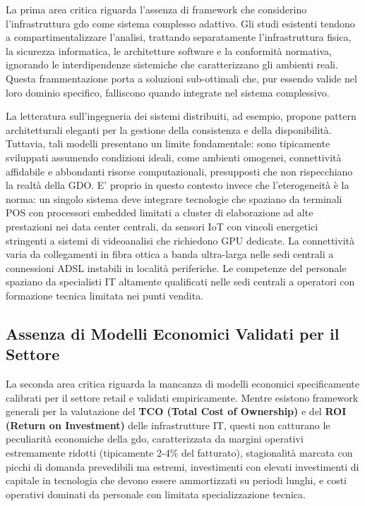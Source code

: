 La prima area critica riguarda l'assenza di framework che considerino l'infrastruttura \gls{gdo} come sistema complesso adattivo. Gli studi esistenti tendono a compartimentalizzare l'analisi, trattando separatamente l'infrastruttura fisica, la sicurezza informatica, le architetture software e la conformità normativa, ignorando le interdipendenze sistemiche che caratterizzano gli ambienti reali. Questa frammentazione porta a soluzioni sub-ottimali che, pur essendo valide nel loro dominio specifico, falliscono quando integrate nel sistema complessivo.

La letteratura sull'ingegneria dei sistemi distribuiti, ad esempio, propone pattern architetturali eleganti per la gestione della consistenza e della disponibilità. Tuttavia, tali modelli presentano un limite fondamentale: sono tipicamente sviluppati assumendo condizioni ideali, come ambienti omogenei, connettività affidabile e abbondanti risorse computazionali, presupposti che non rispecchiano la realtà della GDO. 
E' proprio in questo contesto invece che l'eterogeneità è la norma: un singolo sistema deve integrare tecnologie che spaziano da terminali POS con processori embedded limitati a cluster di elaborazione ad alte prestazioni nei data center centrali, da sensori IoT con vincoli energetici stringenti a sistemi di videoanalisi che richiedono GPU dedicate. La connettività varia da collegamenti in fibra ottica a banda ultra-larga nelle sedi centrali a connessioni ADSL instabili in località periferiche. Le competenze del personale spaziano da specialisti IT altamente qualificati nelle sedi centrali a operatori con formazione tecnica limitata nei punti vendita.

\subsection{Assenza di Modelli Economici Validati per il Settore}

La seconda area critica riguarda la mancanza di modelli economici specificamente calibrati per il settore retail e validati empiricamente. Mentre esistono framework generali per la valutazione del \textbf{TCO (Total Cost of Ownership)} e del \textbf{ROI (Return on Investment) }delle infrastrutture IT, questi non catturano le peculiarità economiche della \gls{gdo}, caratterizzata da margini operativi estremamente ridotti (tipicamente 2-4\% del fatturato), stagionalità marcata con picchi di domanda prevedibili ma estremi, investimenti con elevati investimenti di capitale in tecnologia che devono essere ammortizzati su periodi lunghi, e costi operativi dominati da personale con limitata specializzazione tecnica.

